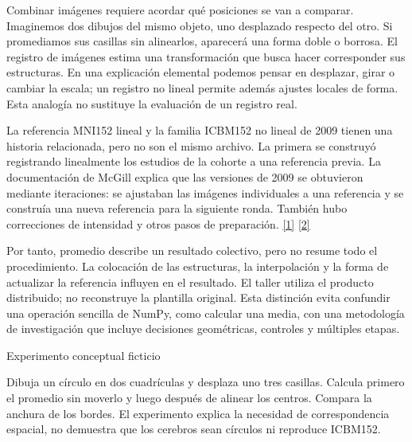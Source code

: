 Combinar imágenes requiere acordar qué posiciones se van a comparar. Imaginemos dos dibujos del mismo objeto, uno desplazado respecto del otro. Si promediamos sus casillas sin alinearlos, aparecerá una forma doble o borrosa. El registro de imágenes estima una transformación que busca hacer corresponder sus estructuras. En una explicación elemental podemos pensar en desplazar, girar o cambiar la escala; un registro no lineal permite además ajustes locales de forma. Esta analogía no sustituye la evaluación de un registro real.


La referencia MNI152 lineal y la familia ICBM152 no lineal de 2009 tienen una historia relacionada, pero no son el mismo archivo. La primera se construyó registrando linealmente los estudios de la cohorte a una referencia previa. La documentación de McGill explica que las versiones de 2009 se obtuvieron mediante iteraciones: se ajustaban las imágenes individuales a una referencia y se construía una nueva referencia para la siguiente ronda. También hubo correcciones de intensidad y otros pasos de preparación. \hyperlink{refR1}{[1]} \hyperlink{refR2}{[2]}


Por tanto, promedio describe un resultado colectivo, pero no resume todo el procedimiento. La colocación de las estructuras, la interpolación y la forma de actualizar la referencia influyen en el resultado. El taller utiliza el producto distribuido; no reconstruye la plantilla original. Esta distinción evita confundir una operación sencilla de NumPy, como calcular una media, con una metodología de investigación que incluye decisiones geométricas, controles y múltiples etapas.




\begin{Idea}{Experimento conceptual ficticio}

Dibuja un círculo en dos cuadrículas y desplaza uno tres casillas. Calcula primero el promedio sin moverlo y luego después de alinear los centros. Compara la anchura de los bordes. El experimento explica la necesidad de correspondencia espacial, no demuestra que los cerebros sean círculos ni reproduce ICBM152.


\end{Idea}

